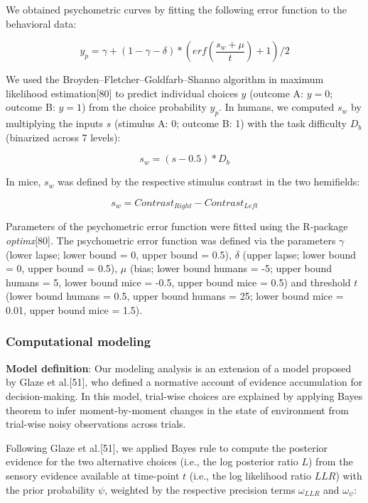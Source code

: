 \documentclass[
]{article}
\begin{document}
We obtained psychometric curves by fitting the following error function
to the behavioral data:

\begin{equation}
y_p = \gamma + (1 - \gamma - \delta) *  (erf(\frac{s_w + \mu}{t}) + 1) / 2
\end{equation}

We used the Broyden--Fletcher--Goldfarb--Shanno algorithm in maximum
likelihood estimation{[}80{]} to predict individual choices \(y\)
(outcome A: \(y = 0\); outcome B: \(y = 1\)) from the choice probability
\(y_p\). In humans, we computed \(s_w\) by multiplying the inputs \(s\)
(stimulus A: 0; outcome B: 1) with the task difficulty \(D_b\)
(binarized across 7 levels):

\begin{equation}
s_w = (s - 0.5) * D_b
\end{equation}

In mice, \(s_w\) was defined by the respective stimulus contrast in the
two hemifields:

\begin{equation}
s_w = Contrast_{Right} - Contrast_{Left}
\end{equation}

Parameters of the psychometric error function were fitted using the
R-package \emph{optimx}{[}80{]}. The psychometric error function was
defined via the parameters \(\gamma\) (lower lapse; lower bound = 0,
upper bound = 0.5), \(\delta\) (upper lapse; lower bound = 0, upper
bound = 0.5), \(\mu\) (bias; lower bound humans = -5; upper bound humans
= 5, lower bound mice = -0.5, upper bound mice = 0.5) and threshold
\(t\) (lower bound humans = 0.5, upper bound humans = 25; lower bound
mice = 0.01, upper bound mice = 1.5).

\hypertarget{computational-modeling}{%
\subsubsection{Computational modeling}\label{computational-modeling}}

\textbf{Model definition}: Our modeling analysis is an extension of a
model proposed by Glaze et al.{[}51{]}, who defined a normative account
of evidence accumulation for decision-making. In this model, trial-wise
choices are explained by applying Bayes theorem to infer
moment-by-moment changes in the state of environment from trial-wise
noisy observations across trials.

Following Glaze et al.{[}51{]}, we applied Bayes rule to compute the
posterior evidence for the two alternative choices (i.e., the log
posterior ratio \(L\)) from the sensory evidence available at time-point
\(t\) (i.e., the log likelihood ratio \(LLR\)) with the prior
probability \(\psi\), weighted by the respective precision terms
\(\omega_{LLR}\) and \(\omega_{\psi}\):
\end{document}
